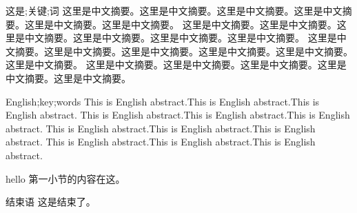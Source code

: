 
\begin{ahnuabstract}{这是;关键;词}
这里是中文摘要。这里是中文摘要。这里是中文摘要。这里是中文摘要。这里是中文摘要。这里是中文摘要。
这里是中文摘要。这里是中文摘要。这里是中文摘要。这里是中文摘要。这里是中文摘要。这里是中文摘要。
这里是中文摘要。这里是中文摘要。这里是中文摘要。这里是中文摘要。这里是中文摘要。这里是中文摘要。
这里是中文摘要。这里是中文摘要。这里是中文摘要。这里是中文摘要。这里是中文摘要。
\end{ahnuabstract}
\begin{ahnueabstract}{English;key;words}
    This is English abstract.This is English abstract.This is English abstract.
    This is English abstract.This is English abstract.This is English abstract.
    This is English abstract.This is English abstract.This is English abstract.
    This is English abstract.This is English abstract.This is English abstract.
\end{ahnueabstract}
hello\cite{hall1968effect}
\hfill 第一小节的内容在这。\hfill
\begin{mysection}{结束语}
    这是结束了。
\end{mysection}

